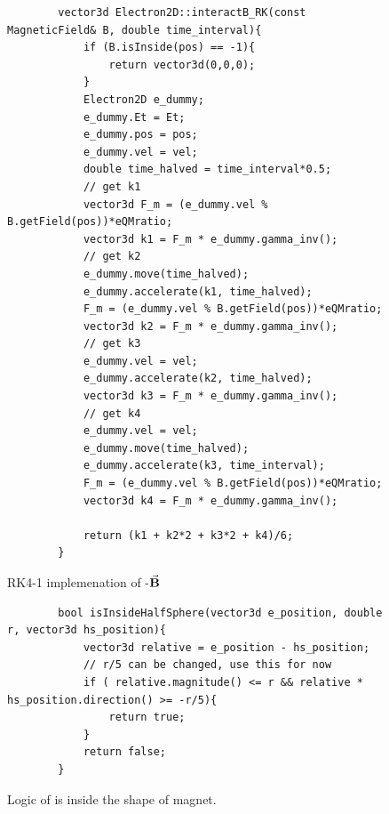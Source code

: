 \documentclass[a4paper,oneside,12pt]{report}
\numberwithin{equation}{chapter}
\begin{document}
\begin{figure}[H]
    \centering
    \begin{verbatim}
        vector3d Electron2D::interactB_RK(const MagneticField& B, double time_interval){
            if (B.isInside(pos) == -1){
                return vector3d(0,0,0);
            }
            Electron2D e_dummy;
            e_dummy.Et = Et;
            e_dummy.pos = pos;
            e_dummy.vel = vel;
            double time_halved = time_interval*0.5;
            // get k1                                       
            vector3d F_m = (e_dummy.vel % B.getField(pos))*eQMratio;                                       
            vector3d k1 = F_m * e_dummy.gamma_inv();     
            // get k2
            e_dummy.move(time_halved);
            e_dummy.accelerate(k1, time_halved);                                              
            F_m = (e_dummy.vel % B.getField(pos))*eQMratio;                                               
            vector3d k2 = F_m * e_dummy.gamma_inv();    
            // get k3
            e_dummy.vel = vel;
            e_dummy.accelerate(k2, time_halved);
            vector3d k3 = F_m * e_dummy.gamma_inv();   
            // get k4
            e_dummy.vel = vel;
            e_dummy.move(time_halved);
            e_dummy.accelerate(k3, time_interval);                                           
            F_m = (e_dummy.vel % B.getField(pos))*eQMratio;  
            vector3d k4 = F_m * e_dummy.gamma_inv();
        
            return (k1 + k2*2 + k3*2 + k4)/6;
        }
    \end{verbatim}
    \vspace{20pt}
\caption{RK4-1 implemenation of \e-$\vec{\textbf{B}}$}
\label{fig:rk1_B}
\end{figure}
\clearpage
\begin{figure}[H]
    \centering
    \begin{verbatim}
        bool isInsideHalfSphere(vector3d e_position, double r, vector3d hs_position){
            vector3d relative = e_position - hs_position;       
            // r/5 can be changed, use this for now                                
            if ( relative.magnitude() <= r && relative * hs_position.direction() >= -r/5){      
                return true;                                                                 
            }
            return false;
        }
    \end{verbatim}
    \vspace{20pt}
\caption{Logic of is \e inside the shape of magnet.}
\label{fig:is_inside_halfsphere}
\end{figure}
\end{document}
